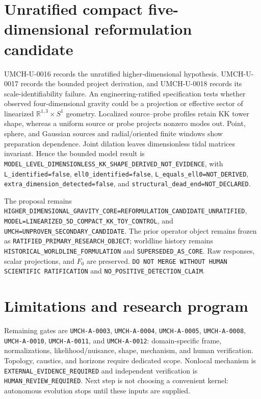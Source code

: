 \documentclass[11pt,a4paper]{article}
\begin{document}
\section{Unratified compact five-dimensional reformulation candidate}\label{sec:u-kk-candidate}
UMCH-U-0016 records the unratified higher-dimensional hypothesis. UMCH-U-0017 records the bounded project derivation, and UMCH-U-0018 records its scale-identifiability failure. An engineering-ratified specification tests whether observed four-dimensional gravity could be a projection or effective sector of linearized $\mathbb{R}^{1,3}\times S^1$ geometry. Localized source--probe profiles retain KK tower shape, whereas a uniform source or probe projects nonzero modes out. Point, sphere, and Gaussian sources and radial/oriented finite windows show preparation dependence. Joint dilation leaves dimensionless tidal matrices invariant. Hence the bounded model result is \verb|MODEL_LEVEL_DIMENSIONLESS_KK_SHAPE_DERIVED_NOT_EVIDENCE|, with \verb|L_identified=false|, \verb|ell0_identified=false|, \verb|L_equals_ell0=NOT_DERIVED|, \verb|extra_dimension_detected=false|, and \verb|structural_dead_end=NOT_DECLARED|.

The proposal remains \verb|HIGHER_DIMENSIONAL_GRAVITY_CORE=REFORMULATION_CANDIDATE_UNRATIFIED|, \verb|MODEL=LINEARIZED_5D_COMPACT_KK_TOY_CONTROL|, and \verb|UMCH=UNPROVEN_SECONDARY_CANDIDATE|. The prior operator object remains frozen as \verb|RATIFIED_PRIMARY_RESEARCH_OBJECT|; worldline history remains \verb|HISTORICAL_WORLDLINE_FORMULATION| and \verb|SUPERSEDED_AS_CORE|. Raw responses, scalar projections, and $F_0$ are preserved. \verb|DO NOT MERGE WITHOUT HUMAN SCIENTIFIC RATIFICATION| and \verb|NO_POSITIVE_DETECTION_CLAIM|.

\section{Limitations and research program}\label{sec:u-limits}
Remaining gates are \verb|UMCH-A-0003|, \verb|UMCH-A-0004|, \verb|UMCH-A-0005|, \verb|UMCH-A-0008|, \verb|UMCH-A-0010|, \verb|UMCH-A-0011|, and \verb|UMCH-A-0012|: domain-specific frame, normalizations, likelihood/nuisance, shape, mechanism, and human verification. Topology, caustics, and horizons require dedicated scope. Nonlocal mechanism is \verb|EXTERNAL_EVIDENCE_REQUIRED| and independent verification is \verb|HUMAN_REVIEW_REQUIRED|. Next step is not choosing a convenient kernel: autonomous evolution stops until these inputs are supplied.
\end{document}
